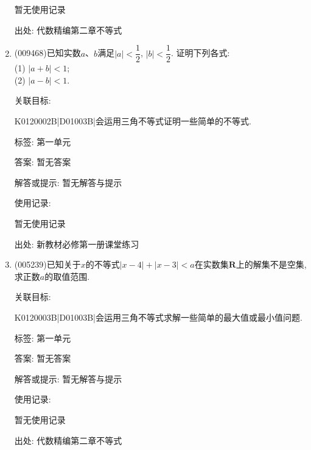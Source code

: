 \documentclass[10pt,a4paper]{article}
\begin{document}
\begin{enumerate}[1.]
暂无使用记录


出处: 代数精编第二章不等式
\item { (009468)}已知实数$a$、$b$满足$|a| <\dfrac 12$, $|b| <\dfrac 12$. 证明下列各式:\\
(1) $|a+b| <1$;\\
(2) $|a-b| <1$.


关联目标:

K0120002B|D01003B|会运用三角不等式证明一些简单的不等式.



标签: 第一单元

答案: 暂无答案

解答或提示: 暂无解答与提示

使用记录:

暂无使用记录


出处: 新教材必修第一册课堂练习
\item { (005239)}已知关于$x$的不等式$|x-4|+|x-3|<a$在实数集$\mathbf{R}$上的解集不是空集, 求正数$a$的取值范围.


关联目标:

K0120003B|D01003B|会运用三角不等式求解一些简单的最大值或最小值问题.



标签: 第一单元

答案: 暂无答案

解答或提示: 暂无解答与提示

使用记录:

暂无使用记录


出处: 代数精编第二章不等式
\end{enumerate}
\end{document}
